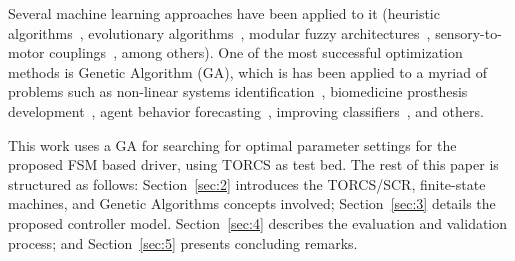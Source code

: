 Several machine learning approaches have been applied to it (heuristic algorithms~\cite{MrRacer}, evolutionary algorithms~\cite{Nallaperuma:2014}, modular fuzzy architectures~\cite{AUTOPIA}, sensory-to-motor couplings~\cite{COBOSTAR}, among others). One of the most successful optimization methods is Genetic Algorithm (GA), which is has been applied to a myriad of problems such as non-linear systems identification~\cite{GACTRL}, biomedicine prosthesis development~\cite{GABIO}, agent behavior forecasting~\cite{GAECO}, improving classifiers~\cite{pedrycz_genetic_2005}, and others.

This work uses a GA for searching for optimal parameter settings for the proposed FSM based driver, using TORCS as test bed. The rest of this paper is structured as follows: Section~\ref{sec:2} introduces the TORCS/SCR, finite-state machines, and Genetic Algorithms concepts involved; Section~\ref{sec:3} details the proposed controller model. Section~\ref{sec:4} describes the evaluation and validation process; and Section~\ref{sec:5} presents concluding remarks.